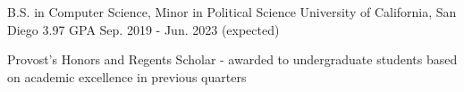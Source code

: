 

\begin{cventries}

    \cventry
    {B.S. in Computer Science, Minor in Political Science} %
    {University of California, San Diego} %
    {3.97 GPA} %
    {Sep. 2019 - Jun. 2023 (expected)} %
    {
      \begin{cvitems} %
        \item {Provost's Honors and Regents Scholar - awarded to undergraduate students based on academic excellence in previous quarters}
      \end{cvitems}
    }

\end{cventries}
